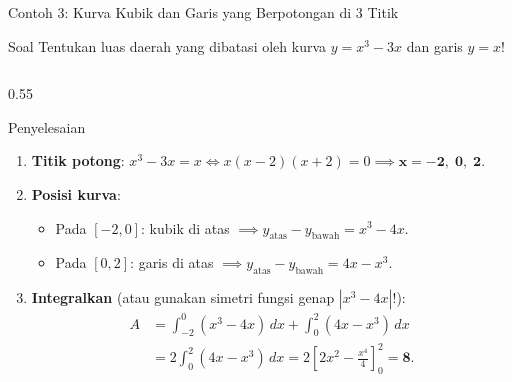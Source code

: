 \documentclass[aspectratio=43,10pt]{beamer}
\begin{document}
\begin{frame}{Contoh 3: Kurva Kubik dan Garis yang Berpotongan di 3 Titik}
    \begin{exampleblock}{Soal}
        \scriptsize
        Tentukan luas daerah yang dibatasi oleh kurva $y = x^3 - 3x$ dan garis $y = x$!
    \end{exampleblock}

    \begin{columns}[c]
        \begin{column}{0.55\textwidth}
            \begin{block}{Penyelesaian}
                \scriptsize\abovedisplayskip=2pt\belowdisplayskip=2pt
                \begin{enumerate}\itemsep=1pt
                    \item \textbf{Titik potong}: $x^3 - 3x = x \iff x(x - 2)(x + 2) = 0 \implies \mathbf{x = -2, \;0, \;2}$.
                    \item \textbf{Posisi kurva}:
                    \begin{itemize}\scriptsize\itemsep=0pt
                        \item Pada $[-2, 0]$: kubik di atas $\implies y_{\text{atas}} - y_{\text{bawah}} = x^3 - 4x$.
                        \item Pada $[0, 2]$: garis di atas $\implies y_{\text{atas}} - y_{\text{bawah}} = 4x - x^3$.
                    \end{itemize}
                    \item \textbf{Integralkan} (atau gunakan simetri fungsi genap $|x^3 - 4x|$!):
                    \begin{align*}
                        A &= \int_{-2}^{0} (x^3 - 4x)\,dx + \int_{0}^{2} (4x - x^3)\,dx\\
                        &= 2\int_{0}^{2} (4x - x^3)\,dx = 2\left[2x^2 - \frac{x^4}{4}\right]_{0}^{2} = \mathbf{8}.
                    \end{align*}
                \end{enumerate}
            \end{block}
        \end{column}


\end{columns}
\end{frame}
\end{document}
